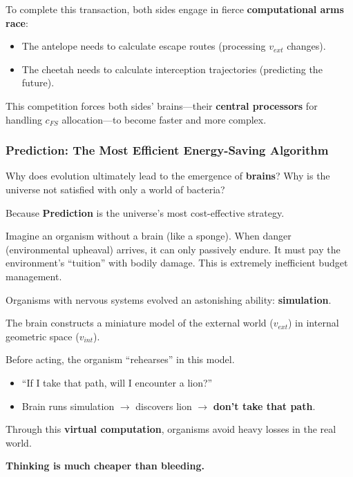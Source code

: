 To complete this transaction, both sides engage in fierce \textbf{computational arms race}:

\begin{itemize}
\item The antelope needs to calculate escape routes (processing $v_{ext}$ changes).

\item The cheetah needs to calculate interception trajectories (predicting the future).
\end{itemize}

This competition forces both sides' brains---their \textbf{central processors} for handling $c_{FS}$ allocation---to become faster and more complex.

\subsubsection{Prediction: The Most Efficient Energy-Saving Algorithm}

Why does evolution ultimately lead to the emergence of \textbf{brains}? Why is the universe not satisfied with only a world of bacteria?

Because \textbf{Prediction} is the universe's most cost-effective strategy.

Imagine an organism without a brain (like a sponge). When danger (environmental upheaval) arrives, it can only passively endure. It must pay the environment's ``tuition'' with bodily damage. This is extremely inefficient budget management.

Organisms with nervous systems evolved an astonishing ability: \textbf{simulation}.

The brain constructs a miniature model of the external world ($v_{ext}$) in internal geometric space ($v_{int}$).

Before acting, the organism ``rehearses'' in this model.

\begin{itemize}
\item ``If I take that path, will I encounter a lion?''

\item Brain runs simulation $\rightarrow$ discovers lion $\rightarrow$ \textbf{don't take that path}.
\end{itemize}

Through this \textbf{virtual computation}, organisms avoid heavy losses in the real world.

\textbf{Thinking is much cheaper than bleeding.}

